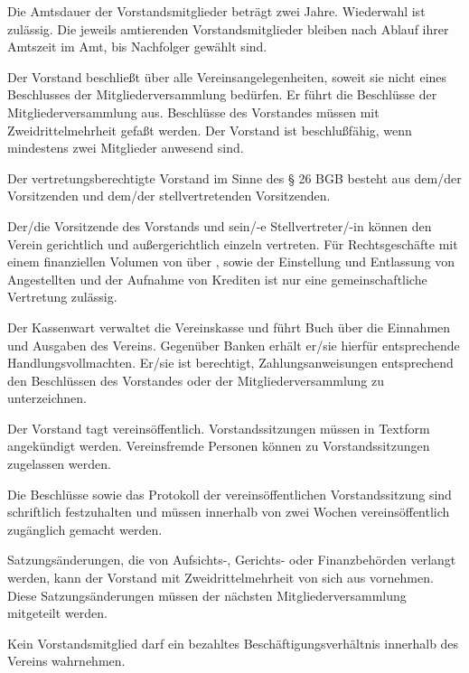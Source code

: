 \documentclass[draft]{scrartcl}
\begin{document}
\begin{contract}
Die Amtsdauer der Vorstandsmitglieder beträgt zwei Jahre. Wiederwahl ist
zulässig. Die jeweils amtierenden Vorstandsmitglieder bleiben nach Ablauf
ihrer Amtszeit im Amt, bis Nachfolger gewählt sind.

Der Vorstand beschließt über alle Vereinsangelegenheiten, soweit sie nicht
eines Beschlusses der Mitgliederversammlung bedürfen. Er führt die Beschlüsse
der Mitgliederversammlung aus. Beschlüsse des Vorstandes müssen mit
Zweidrittelmehrheit gefaßt werden. Der Vorstand ist beschlußfähig, wenn
mindestens zwei Mitglieder anwesend sind.


Der vertretungsberechtigte Vorstand im Sinne des § 26 BGB besteht aus dem/der
Vorsitzenden und dem/der stellvertretenden Vorsitzenden.

Der/die Vorsitzende des Vorstands und sein/-e Stellvertreter/-in können den
Verein gerichtlich und außergerichtlich einzeln vertreten. Für Rechtsgeschäfte
mit einem finanziellen Volumen von über , sowie der Einstellung und
Entlassung von Angestellten und der Aufnahme von Krediten ist nur eine
gemeinschaftliche Vertretung zulässig.

Der Kassenwart verwaltet die Vereinskasse und führt Buch über die Einnahmen
und Ausgaben des Vereins. Gegenüber Banken erhält er/sie hierfür entsprechende
Handlungsvollmachten. Er/sie ist berechtigt, Zahlungsanweisungen entsprechend
den Beschlüssen des Vorstandes oder der Mitgliederversammlung zu
unterzeichnen.


Der Vorstand tagt vereinsöffentlich. Vorstandssitzungen müssen in Textform
angekündigt werden. Vereinsfremde Personen können zu Vorstandssitzungen
zugelassen werden.

Die Beschlüsse sowie das Protokoll der vereinsöffentlichen Vorstandssitzung
sind schriftlich festzuhalten und müssen innerhalb von zwei Wochen
vereinsöffentlich zu\-gäng\-lich gemacht werden.


Satzungsänderungen, die von Aufsichts-, Gerichts- oder Finanzbehörden verlangt
werden, kann der Vorstand mit Zweidrittelmehrheit von sich aus vornehmen.
Diese Satzungsänderungen müssen der nächsten Mitgliederversammlung mitgeteilt
werden.


Kein Vorstandsmitglied darf ein bezahltes Beschäftigungsverhältnis innerhalb
des Vereins wahrnehmen.


\end{contract}
\end{document}
